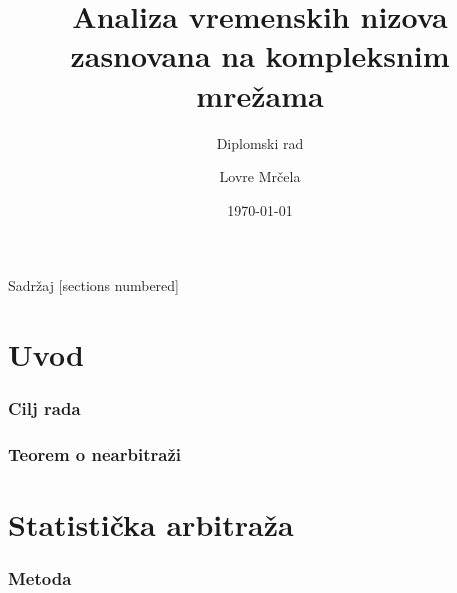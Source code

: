 \documentclass[11pt]{beamer}
\begin{document}
  \author{Lovre Mrčela}
  \title{Analiza vremenskih nizova zasnovana na kompleksnim mrežama}
  \subtitle{Diplomski rad}
  \date{\today}
  \begin{frame}[plain]
  \maketitle
  \end{frame}

  \begin{frame}{Sadržaj}
    [sections numbered]
    \tableofcontents[hideallsubsections]
  \end{frame}
  
  \section{Uvod}
  \begin{frame}
    \frametitle{Cilj rada}
    \frametitle{Teorem o nearbitraži}
  \end{frame}
  
  \section{Statistička arbitraža}
  \begin{frame}
    \frametitle{Metoda}
  \end{frame}
\end{document}
